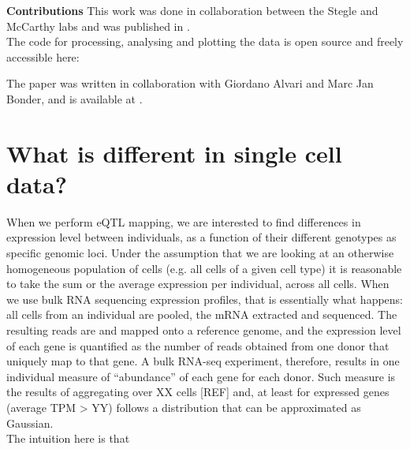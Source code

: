 \begin{Abstract}
\hspace{-3mm}\textbf{Contributions} This work was done in collaboration between the Stegle and McCarthy labs and was published in \cite{}.\\

The code for processing, analysing and plotting the data is open source and freely accessible here:

The paper was written in collaboration with Giordano Alvari and Marc Jan Bonder, and is available at .
\vfill
\end{Abstract}

\section{What is different in single cell data?}

When we perform eQTL mapping, we are interested to find differences in expression level between individuals, as a function of their different genotypes as specific genomic loci. 
Under the assumption that we are looking at an otherwise homogeneous population of cells (e.g. all cells of a given cell type) it is reasonable to take the sum or the average expression per individual, across all cells.
When we use bulk RNA sequencing expression profiles, that is essentially what happens: all cells from an individual are pooled, the mRNA extracted and sequenced. 
The resulting reads are and mapped onto a reference genome, and the expression level of each gene is quantified as the number of reads obtained from one donor that uniquely map to that gene. 
A bulk RNA-seq experiment, therefore, results in one individual measure of “abundance” of each gene for each donor. 
Such measure is the results of aggregating over XX cells [REF] and, at least for expressed genes (average TPM > YY) follows a distribution that can be approximated as Gaussian.\\

The intuition here is that 

